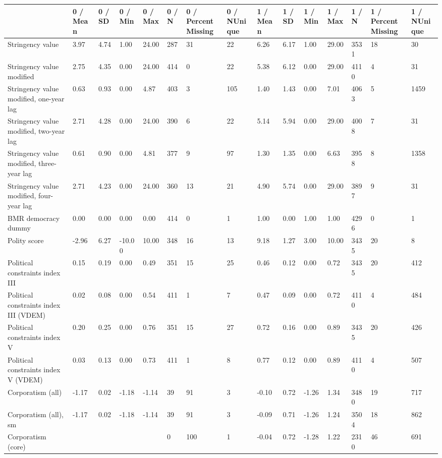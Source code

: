 
\begin{longtable}{lllllllllllllll}
\toprule
  & 0 / Mean & 0 / SD & 0 / Min & 0 / Max & 0 / N & 0 / PercentMissing & 0 / NUnique & 1 / Mean & 1 / SD & 1 / Min & 1 / Max & 1 / N & 1 / PercentMissing & 1 / NUnique\\
\midrule
Stringency value & 3.97 & 4.74 & 1.00 & 24.00 & 287 & 31 & 22 & 6.26 & 6.17 & 1.00 & 29.00 & 3531 & 18 & 30\\
Stringency value modified & 2.75 & 4.35 & 0.00 & 24.00 & 414 & 0 & 22 & 5.38 & 6.12 & 0.00 & 29.00 & 4110 & 4 & 31\\
Stringency value modified, one-year lag & 0.63 & 0.93 & 0.00 & 4.87 & 403 & 3 & 105 & 1.40 & 1.43 & 0.00 & 7.01 & 4063 & 5 & 1459\\
Stringency value modified, two-year lag & 2.71 & 4.28 & 0.00 & 24.00 & 390 & 6 & 22 & 5.14 & 5.94 & 0.00 & 29.00 & 4008 & 7 & 31\\
Stringency value modified, three-year lag & 0.61 & 0.90 & 0.00 & 4.81 & 377 & 9 & 97 & 1.30 & 1.35 & 0.00 & 6.63 & 3958 & 8 & 1358\\
\addlinespace
Stringency value modified, four-year lag & 2.71 & 4.23 & 0.00 & 24.00 & 360 & 13 & 21 & 4.90 & 5.74 & 0.00 & 29.00 & 3897 & 9 & 31\\
BMR democracy dummy & 0.00 & 0.00 & 0.00 & 0.00 & 414 & 0 & 1 & 1.00 & 0.00 & 1.00 & 1.00 & 4296 & 0 & 1\\
Polity score & -2.96 & 6.27 & -10.00 & 10.00 & 348 & 16 & 13 & 9.18 & 1.27 & 3.00 & 10.00 & 3435 & 20 & 8\\
Political constraints index III & 0.15 & 0.19 & 0.00 & 0.49 & 351 & 15 & 25 & 0.46 & 0.12 & 0.00 & 0.72 & 3435 & 20 & 412\\
Political constraints index III (VDEM) & 0.02 & 0.08 & 0.00 & 0.54 & 411 & 1 & 7 & 0.47 & 0.09 & 0.00 & 0.72 & 4110 & 4 & 484\\
\addlinespace
Political constraints index V & 0.20 & 0.25 & 0.00 & 0.76 & 351 & 15 & 27 & 0.72 & 0.16 & 0.00 & 0.89 & 3435 & 20 & 426\\
Political constraints index V (VDEM) & 0.03 & 0.13 & 0.00 & 0.73 & 411 & 1 & 8 & 0.77 & 0.12 & 0.00 & 0.89 & 4110 & 4 & 507\\
Corporatism (all) & -1.17 & 0.02 & -1.18 & -1.14 & 39 & 91 & 3 & -0.10 & 0.72 & -1.26 & 1.34 & 3480 & 19 & 717\\
Corporatism (all), sm & -1.17 & 0.02 & -1.18 & -1.14 & 39 & 91 & 3 & -0.09 & 0.71 & -1.26 & 1.24 & 3504 & 18 & 862\\
Corporatism (core) &  &  &  &  & 0 & 100 & 1 & -0.04 & 0.72 & -1.28 & 1.22 & 2310 & 46 & 691\\

\end{longtable}

